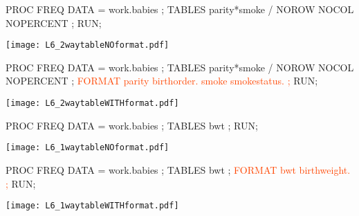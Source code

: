\begin{frame}[fragile]
\hspace*{-0.3in}
\footnotesize
\begin{code}{.0}
PROC FREQ DATA = work.babies ;
   TABLES parity*smoke /
   NOROW NOCOL NOPERCENT ;
RUN;


\end{code}
\begin{center}
\texttt{[image: L6\_2waytableNOformat.pdf]}
\end{center}
\emp
{} \hspace{1in} \emp
{}
\footnotesize
\begin{code}{.0}
PROC FREQ DATA = work.babies ;
    TABLES parity*smoke /
    NOROW NOCOL NOPERCENT ;
    \textcolor{OrangeRed}{FORMAT parity birthorder.}
           \textcolor{OrangeRed}{smoke smokestatus. ;}
RUN;
\end{code}
\begin{center}
\texttt{[image: L6\_2waytableWITHformat.pdf]}
\end{center}
\emp
\end{frame}

\begin{frame}[fragile]
\hspace*{-0.3in}
\footnotesize
\begin{code}{.0}
PROC FREQ DATA = work.babies ;
   TABLES bwt ;
RUN;

\end{code}
\begin{center}
\texttt{[image: L6\_1waytableNOformat.pdf]}
\end{center}
\emp
{} \hspace{1in} \emp
{}
\footnotesize
\begin{code}{.0}
PROC FREQ DATA = work.babies ;
    TABLES bwt ;
    \textcolor{OrangeRed}{FORMAT bwt birthweight. ;}
RUN;
\end{code}
\begin{center}
\texttt{[image: L6\_1waytableWITHformat.pdf]}
\end{center}
\emp
\end{frame}

 